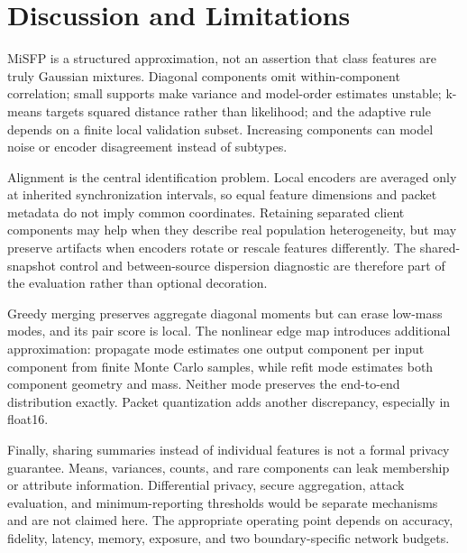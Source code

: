 \section{Discussion and Limitations}\label{sec:discussion}
MiSFP is a structured approximation, not an assertion that class features are truly Gaussian mixtures. Diagonal components omit within-component correlation; small supports make variance and model-order estimates unstable; k-means targets squared distance rather than likelihood; and the adaptive rule depends on a finite local validation subset. Increasing components can model noise or encoder disagreement instead of subtypes.

Alignment is the central identification problem. Local encoders are averaged only at inherited synchronization intervals, so equal feature dimensions and packet metadata do not imply common coordinates. Retaining separated client components may help when they describe real population heterogeneity, but may preserve artifacts when encoders rotate or rescale features differently. The shared-snapshot control and between-source dispersion diagnostic are therefore part of the evaluation rather than optional decoration.

Greedy merging preserves aggregate diagonal moments but can erase low-mass modes, and its pair score is local. The nonlinear edge map introduces additional approximation: propagate mode estimates one output component per input component from finite Monte Carlo samples, while refit mode estimates both component geometry and mass. Neither mode preserves the end-to-end distribution exactly. Packet quantization adds another discrepancy, especially in float16.

Finally, sharing summaries instead of individual features is not a formal privacy guarantee. Means, variances, counts, and rare components can leak membership or attribute information. Differential privacy, secure aggregation, attack evaluation, and minimum-reporting thresholds would be separate mechanisms and are not claimed here. The appropriate operating point depends on accuracy, fidelity, latency, memory, exposure, and two boundary-specific network budgets.

